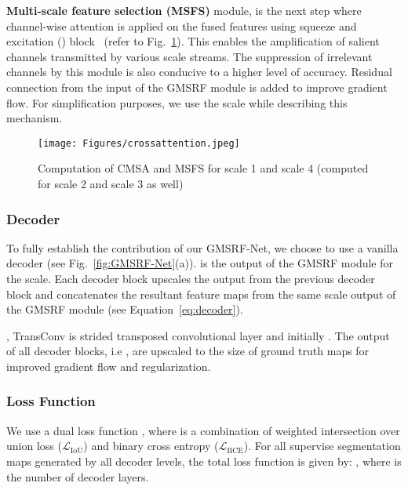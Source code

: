 \documentclass[conference]{IEEEtran}
\newcommand{\loss}{\ensuremath{\mathcal{L}}}
\newcommand{\lbce}{\ensuremath{\loss_\text{BCE}}\xspace}
\newcommand{\liou}{\ensuremath{\loss_\text{IoU}}\xspace}
\begin{document}
\textbf{Multi-scale feature selection (MSFS)} module, is the next step where channel-wise attention is applied on the fused features using squeeze and excitation () block~\cite{hu2018squeeze} (refer to Fig.~\ref{fig:GMSRF-Attention}). This enables the amplification of salient channels transmitted by various scale streams. The suppression of irrelevant channels by this module is also conducive to a higher level of accuracy.
Residual connection from the input of the GMSRF module is added to improve gradient flow. For simplification purposes, we use the  scale while describing this mechanism. 
\begin{figure}[!t]
    \centering
    \texttt{[image: Figures/crossattention.jpeg]}
    \caption{Computation of CMSA and MSFS for scale 1 and scale 4 (computed for scale 2 and scale 3 as well)}
    \label{fig:GMSRF-Attention}
\end{figure}
\subsubsection{Decoder}
To fully establish the contribution of our GMSRF-Net, we choose to use a vanilla decoder (see Fig.~\ref{fig:GMSRF-Net}(a)).  is the output of the GMSRF module for the  scale. Each decoder block upscales the output from the previous decoder block and concatenates the resultant feature maps from the same scale output of the GMSRF module (see Equation~\ref{eq:decoder}).

, TransConv is strided transposed convolutional layer and initially . The output of all decoder blocks, i.e , are upscaled to the size of ground truth maps for improved gradient flow and regularization. 


\subsubsection{Loss Function}
We use a dual loss function , where  is a combination of weighted intersection over union loss (\liou) and binary cross entropy (\lbce). For all supervise segmentation maps generated by all decoder levels, the total loss function is given by: , where  is the number of decoder layers.
\end{document}

